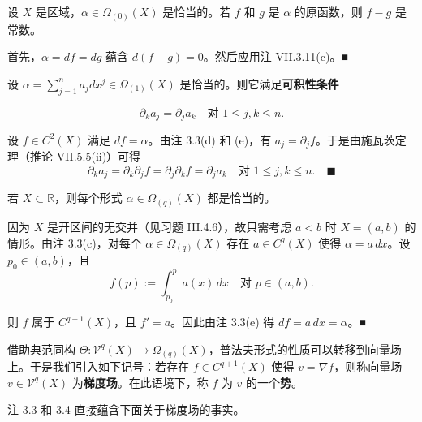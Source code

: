 \begin{remark}

\begin{items}
\item

设 $ X $ 是区域，$ \alpha \in \Omega_{(0)}(X) $ 是恰当的。若 $ f $ 和 $ g $ 是 $ \alpha $ 的原函数，则 $ f - g $ 是常数。

\proofhead
首先，$ \alpha = df = dg $ 蕴含 $ d(f - g) = 0 $。然后应用注 VII.3.11(c)。\nobreak\hspace{0.35em}■
\item

设 $ \alpha = \sum_{j=1}^{n}a_{j}dx^{j} \in \Omega_{(1)}(X) $ 是恰当的。则它满足\textbf{可积性条件}

\[
\partial_{k}a_{j} = \partial_{j}a_{k} \quad \text{对 } 1 \le j,k \le n .
\]

\proofhead
设 $ f \in C^{2}(X) $ 满足 $ df = \alpha $。由注 3.3(d) 和 (e)，有 $ a_{j} = \partial_{j}f $。于是由施瓦茨定理（推论 VII.5.5(ii)）可得
\[
\partial_{k}a_{j} = \partial_{k}\partial_{j}f = \partial_{j}\partial_{k}f = \partial_{j}a_{k} \quad \text{对 } 1 \le j,k \le n .\quad\blacksquare
\]
\item

若 $ X \subset \mathbb{R} $，则每个形式 $ \alpha \in \Omega_{(q)}(X) $ 都是恰当的。

\proofhead
因为 $ X $ 是开区间的无交并（见习题 III.4.6），故只需考虑 $ a < b $ 时 $ X = (a,b) $ 的情形。由注 3.3(c)，对每个 $ \alpha \in \Omega_{(q)}(X) $ 存在 $ a \in C^{q}(X) $ 使得 $ \alpha = a\,dx $。设 $ p_{0} \in (a,b) $，且
\[
f(p) := \int_{p_{0}}^{p}a(x)\,dx \quad \text{对 } p \in (a,b) .
\]

则 $ f $ 属于 $ C^{q+1}(X) $，且 $ f' = a $。因此由注 3.3(e) 得 $ df = a\,dx = \alpha $。\nobreak\hspace{0.35em}■

\end{items}

借助典范同构 $ \Theta : \mathcal{V}^{q}(X) \to \Omega_{(q)}(X) $，普法夫形式的性质可以转移到向量场上。于是我们引入如下记号：若存在 $ f \in C^{q+1}(X) $ 使得 $ v = \nabla f $，则称向量场 $ v \in \mathcal{V}^{q}(X) $ 为\textbf{梯度场}。在此语境下，称 $ f $ 为 $ v $ 的一个\textbf{势}。

注 3.3 和 3.4 直接蕴含下面关于梯度场的事实。

\end{remark}

